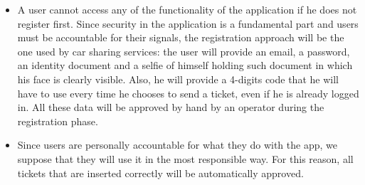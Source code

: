 \begin{itemize}
    \item A user cannot access any of the functionality of the application if he does not register first.
        Since security in the application is a fundamental part and users must be accountable for their signals,
        the registration approach will be the one used by car sharing services: the user will provide an email, 
        a password, an identity document and a selfie of himself holding such document in which his face is clearly visible.
        Also, he will provide a 4-digits code that he will have to use every time he chooses to send a ticket, even if
        he is already logged in. All these data will be approved by hand by an operator during the registration phase.
    \item Since users are personally accountable for what they do with the app, we suppose that they will use it
        in the most responsible way. For this reason, all tickets that are inserted correctly will be automatically approved.
\end{itemize}